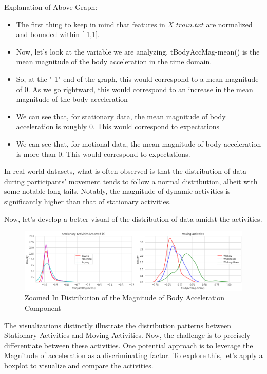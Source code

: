 \documentclass[conference]{IEEEtran}
\begin{document}
Explanation of Above Graph: \newline 
\begin{itemize}
    \item The first thing to keep in mind that features in $X\_train.txt$ are normalized and bounded within [-1,1].
    \item Now, let's look at the variable we are analyzing. tBodyAccMag-mean() is the mean magnitude of the body acceleration in the time domain. 
    \item So, at the "-1" end of the graph, this would correspond to a mean magnitude of 0. As we go rightward, this would correspond to an increase in the  mean magnitude of the body acceleration
    \item We can see that, for stationary data, the mean magnitude of body acceleration is roughly 0. This would correspond to expectations
    \item We can see that, for motional data, the mean magnitude of body acceleration is more than 0. This would correspond to expectations. 
\end{itemize}


In real-world datasets, what is often observed is that the distribution of data during participants' movement tends to follow a normal distribution, albeit with some notable long tails. Notably, the magnitude of dynamic activities is significantly higher than that of stationary activities.  \newline 

Now, let's develop a better visual of the distribution of data amidst the activities. \newline 

\begin{figure}[h!]
	\includegraphics[width= 1.0 \linewidth]{zoomed_distribution_acc_activity.png}
	\centering
	\caption{Zoomed In Distribution of the Magnitude of Body Acceleration Component}
	\label{zoomed_distribution_acc_activity.png}
\end{figure}

The visualizations distinctly illustrate the distribution patterns between Stationary Activities and Moving Activities. Now, the challenge is to precisely differentiate between these activities. One potential approach is to leverage the Magnitude of acceleration as a discriminating factor. To explore this, let's apply a boxplot to visualize and compare the activities.
\end{document}
